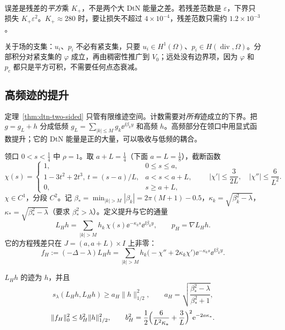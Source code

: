 \documentclass[11pt,a4paper,fontset=fandol]{ctexart}
\begin{document}
\begin{keypoint}
误差是残差的\emph{平方}乘 $K_+$，不是两个大 DtN 能量之差。若残差范数是 $\varepsilon$，下界只损失 $K_+\varepsilon^2$。$K_+\approx280$ 时，要让损失不超过 $4\times10^{-4}$，残差范数只需约 $1.2\times10^{-3}$。
\end{keypoint}

关于场的支集：$u_i$、$p_i$ 不必有紧支集，只要 $u_i\in H^1(\Omega)$、$p_i\in H(\operatorname{div},\Omega)$。分部积分对紧支集的 $\varphi$ 成立，再由稠密性推广到 $V_0$；远处没有边界项，因为 $\varphi$ 和 $p_c$ 都只是平方可积，不需要任何点态衰减。

\subsection{高频迹的提升}

定理~\ref{thm:dtn-two-sided} 只管有限维迹空间。计数需要对\emph{所有}迹成立的下界。把 $g=g_L+h$ 分成低频 $g_L=\sum_{|k|\le M}g_k\ee^{\ii\beta_ky}$ 和高频 $h$。高频部分在领口中用显式函数提升；它的 DtN 能量是正的大量，可以吸收与低频的耦合。

领口 $0<s<\tfrac14$ 中 $\rho=1$。取 $a+L=\tfrac14$（下面 $a=L=\tfrac18$），截断函数
\[
\chi(s)=\begin{cases}1,&0\le s\le a,\\ 1-3t^2+2t^3,\ t=(s-a)/L,&a<s<a+L,\\ 0,&s\ge a+L,\end{cases}\qquad |\chi'|\le\frac3{2L},\quad|\chi''|\le\frac6{L^2}.
\]
$\chi\in C^1$，分段 $C^2$。记 $\beta_*=\min_{|k|>M}|\beta_k|=2\pi(M+1)-0.5$，$\kappa_k=\sqrt{\beta_k^2-\lambda}$，$\kappa_*=\sqrt{\beta_*^2-\lambda}$（要求 $\beta_*^2>\lambda$）。定义提升与它的通量
\[
L_Hh=\sum_{|k|>M}h_k\,\chi(s)\ee^{-\kappa_ks}\ee^{\ii\beta_ky},\qquad p_H=\nabla L_Hh .
\]
它的方程残差只在 $J=(a,a+L)\times I$ 上非零：
\[
f_H:=(-\Delta-\lambda)L_Hh=\sum_{|k|>M}h_k\bigl(-\chi''+2\kappa_k\chi'\bigr)\ee^{-\kappa_ks}\ee^{\ii\beta_ky}.
\]

\begin{lemma}[高频提升]
\label{lem:high-lift}
$L_Hh$ 的迹为 $h$，并且
\[
s_\lambda(L_Hh,L_Hh)\ge a_H\|h\|_{1/2}^2,\qquad a_H=\sqrt{\frac{\beta_*^2-\lambda}{\beta_*^2+1}},
\]
\[
\|f_H\|_0^2\le b_H^2\|h\|_{1/2}^2,\qquad b_H^2=\frac12\Bigl(\frac6{L^2\kappa_*}+\frac3L\Bigr)^2\mathrm{e}^{-2a\kappa_*}.
\]
\end{lemma}
\end{document}
